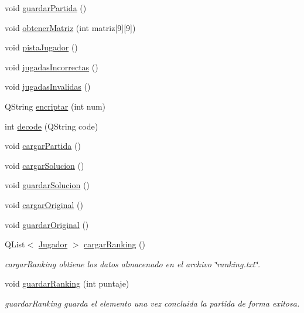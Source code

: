 \begin{DoxyCompactItemize}
\item 
void \hyperlink{classsudoku_a382e974f9b268bad72349e835046bc9e}{guardar\-Partida} ()
\item 
void \hyperlink{classsudoku_ab810a66d51bbe7abef401fff3bbeab66}{obtener\-Matriz} (int matriz\mbox{[}9\mbox{]}\mbox{[}9\mbox{]})
\item 
void \hyperlink{classsudoku_a609094f632cbb607bcf4ccc6c5163ee6}{pista\-Jugador} ()
\item 
void \hyperlink{classsudoku_a557f08c7f68d6f464cf55b6cb263e4f1}{jugadas\-Incorrectas} ()
\item 
void \hyperlink{classsudoku_aa59a6bcde7a2de2b8522ca45de7e7fda}{jugadas\-Invalidas} ()
\item 
Q\-String \hyperlink{classsudoku_a801aaa352372d14d0e782c74e59dcffd}{encriptar} (int num)
\item 
int \hyperlink{classsudoku_a38e9561028b7e53bcb33a7b41301a25c}{decode} (Q\-String code)
\item 
void \hyperlink{classsudoku_a52516f05ede755c0a383d0ead1eb7f98}{cargar\-Partida} ()
\item 
void \hyperlink{classsudoku_aaf120f44b1fb018460832c90f3411115}{cargar\-Solucion} ()
\item 
void \hyperlink{classsudoku_a56f04c8bd9362116a7d558a58a621167}{guardar\-Solucion} ()
\item 
void \hyperlink{classsudoku_a422ab0aa3c2044ee421283a69270ac38}{cargar\-Original} ()
\item 
void \hyperlink{classsudoku_a7bd027391311e65fc690df2f3bc67a44}{guardar\-Original} ()
\item 
Q\-List$<$ \hyperlink{class_jugador}{Jugador} $>$ \hyperlink{classsudoku_aed2f8fec3117c5a7cb8c3a2f510a28c9}{cargar\-Ranking} ()
\begin{DoxyCompactList}\small\item\em cargar\-Ranking obtiene los datos almacenado en el archivo \char`\"{}ranking.\-txt\char`\"{}. \end{DoxyCompactList}\item 
void \hyperlink{classsudoku_a2811b7d6ec908b16314a6ff6ec2659dc}{guardar\-Ranking} (int puntaje)
\begin{DoxyCompactList}\small\item\em guardar\-Ranking guarda el elemento una vez concluida la partida de forma exitosa. \end{DoxyCompactList}\end{DoxyCompactItemize}
